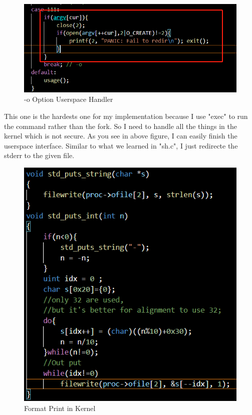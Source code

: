 \documentclass[11pt,oneside,a4paper]{article}
\begin{document}
\begin{figure}[H]
    \includegraphics[width=4.75in]{1-33.png}
    \centering
    \caption{-o Option Userspace Handler}
\end{figure}

This one is the hardests one for my implementation because I use "exec" to run the command
rather than the fork. So I need to handle all the things in the kernel which is not secure.
As you see in above figure, I can easily finish the userspace interface. Similar to what 
we learned in "sh.c", I just redirecte the stderr to the given file. 

\begin{figure}[H]
    \includegraphics[width=4.75in]{1-34.png}
    \centering
    \caption{Format Print in Kernel}
\end{figure}
\end{document}
